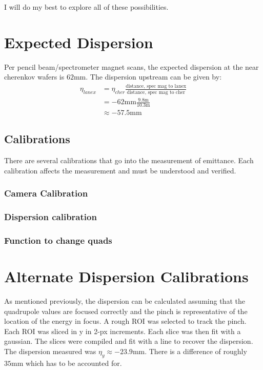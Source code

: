 \documentclass[aps,prl,twocolumn,groupedaddress]{revtex4}
\begin{document}
I will do my best to explore all of these possibilities.

\section{Expected Dispersion}

Per pencil beam/spectrometer magnet scans, the expected dispersion at the near cherenkov wafers is $62\text{mm}$.  The dispersion upstream can be given by:
\begin{align}
	\eta_{lanex} &= \eta_{cher} \frac{\text{distance, spec mag to lanex}}{\text{distance, spec mag to cher}}\\
	&= -\text{62mm} \frac{\text{9.8m}}{\text{10.3m}}\\
	&\approx -\text{57.5mm}
	\label{}
\end{align}

\subsection{Calibrations}

There are several calibrations that go into the measurement of emittance.  Each calibration affects the measurement and must be understood and verified.

\subsubsection{Camera Calibration}

\subsubsection{Dispersion calibration}

\subsubsection{Function to change quads}

\section{Alternate Dispersion Calibrations}

As mentioned previously, the dispersion can be calculated assuming that the quadrupole values are focused correctly and the pinch is representative of the location of the energy in focus.  A rough ROI was selected to track the pinch.  Each ROI was sliced in y in 2-px increments.  Each slice was then fit with a gaussian.  The slices were compiled and fit with a line to recover the dispersion.  The dispersion measured was $\eta_y\approx-23.9\text{mm}$.  There is a difference of roughly $35\text{mm}$ which has to be accounted for.
\end{document}
